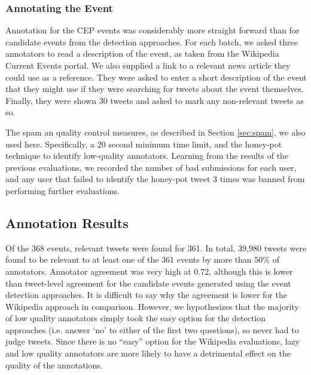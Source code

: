 \subsubsection{Annotating the Event}
Annotation for the CEP events was considerably more straight forward than for candidate events from the detection approaches.
For each batch, we asked three annotators to read a description of the event, as taken from the Wikipedia Current Events portal.
We also supplied a link to a relevant news article they could use as a reference.
They were asked to enter a short description of the event that they might use if they were searching for tweets about the event themselves.
Finally, they were shown 30 tweets and asked to mark any non-relevant tweets as so.

The spam an quality control measures, as described in Section \ref{sec:spam}, we also used here.
Specifically, a 20 second minimum time limit, and the honey-pot technique to identify low-quality annotators.
Learning from the results of the previous evaluations, we recorded the number of bad submissions for each user, and any user that failed to identify the honey-pot tweet 3 times was banned from performing further evaluations.


\subsection{Annotation Results}
Of the 368 events, relevant tweets were found for 361.
In total, 39,980 tweets were found to be relevant to at least one of the 361 events by more than 50\% of annotators.
Annotator agreement was very high at 0.72, although this is lower than tweet-level agreement for the candidate events generated using the event detection approaches.
It is difficult to say why the agreement is lower for the Wikipedia approach in comparison.
However, we hypothesizes that the majority of low quality annotators simply took the easy option for the detection approaches (i.e. answer `no' to either of the first two questions), so never had to judge tweets.
Since there is no ``easy'' option for the Wikipedia evaluations, lazy and low quality annotators are more likely to have a detrimental effect on the quality of the annotations.